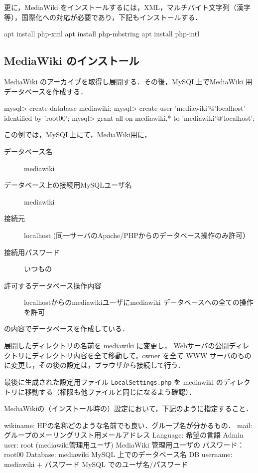 更に，MediaWiki をインストールするには，XML，マルチバイト文字列（漢字等），国際化への対応が必要であり，下記もインストールする．

\begin{cli}
apt install php-xml
apt install php-mbstring
apt install php-intl
\end{cli}

\subsection{MediaWiki のインストール}

MediaWiki のアーカイブを取得し展開する．その後，MySQL上でMediaWiki 用データベースを作成する．
\begin{cli}
mysql> create database mediawiki;
mysql> create user 'mediawiki'@'localhost' identified by 'root00';
mysql> grant all on mediawiki.* to 'mediawiki'@'localhost';
\end{cli}
この例では，MySQL上にて，MediaWiki用に，
\begin{description}
 \item[データベース名] mediawiki
 \item[データベース上の接続用MySQLユーザ名] mediawiki
 \item[接続元] localhost (同一サーバのApache/PHPからのデータベース操作のみ許可）
 \item[接続用パスワード] いつもの
 \item[許可するデータベース操作内容] localhostからのmediawikiユーザにmediawiki データベースへの全ての操作を許可
\end{description}
の内容でデータベースを作成している．

展開したディレクトリの名前を mediawiki に変更し，
Webサーバの公開ディレクトリにディレクトリ内容を全て移動して，owner を全て WWW サーバのものに変更し，その後の設定は，ブラウザから接続して行う．

最後に生成された設定用ファイル \texttt{LocalSettings.php} を mediawiki のディレクトリに移動する（権限も他ファイルと同じになるよう確認）．

MediaWikiの（インストール時の）設定において，下記のように指定すること．

\begin{cli}
wikiname: HPの名称どのような名前でも良い．グループ名が分かるもの．
mail: グループのメーリングリスト用メールアドレス
Language: 希望の言語
Admin user: root (mediawiki管理用ユーザ)
        MediaWiki 管理用ユーザの
        パスワード：root00
Database: mediawiki
        MySQL 上でのデータベース名
DB username: mediawiki
        + パスワード
        MySQL でのユーザ名/パスワード
\end{cli}

